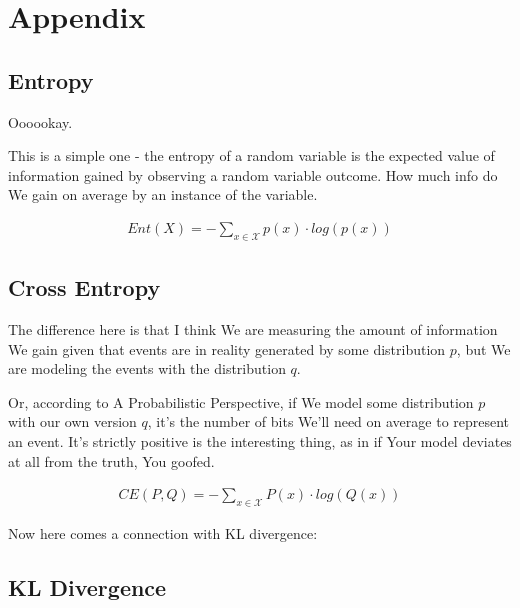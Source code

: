 \documentclass{article}
\begin{document}
		
		
		
		
		
		
		
		
		
		
		
		
		
		

\newpage\phantom{a}
\newpage		
\section{Appendix}

	\subsection{Entropy}
	
		Oooookay.
		
		This is a simple one - the entropy of a random variable is the expected value of information gained by observing a random variable outcome. How much info do We gain on average by an instance of the variable.
		
		\begin{align}
			Ent(X) = -\sum_{x\in\mathcal{X}} p(x)\cdot log(p(x))
		\end{align}
		
	\subsection{Cross Entropy}
	
		The difference here is that I think We are measuring the amount of information We gain given that events are in reality generated by some distribution $p$, but We are modeling the events with the distribution $q$.
		
		Or, according to A Probabilistic Perspective, if We model some distribution $p$ with our own version $q$, it's the number of bits We'll need on average to represent an event. It's strictly positive is the interesting thing, as in if Your model deviates at all from the truth, You goofed.
		
		\begin{align}
			CE(P, Q) = -\sum_{x\in\mathcal{X}} P(x)\cdot log(Q(x))
		\end{align}
		
		Now here comes a connection with KL divergence:
		
	\subsection{KL Divergence}
	
\end{document}
